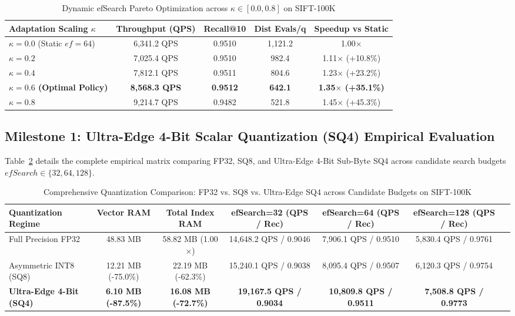 \documentclass[conference,10pt]{IEEEtran}
\begin{document}
\begin{table}[htbp]
\caption{Dynamic efSearch Pareto Optimization across $\kappa \in [0.0, 0.8]$ on SIFT-100K}
\label{tab:dynamic_ef}
\centering
\begin{tabular}{lcccc}
\toprule
\textbf{Adaptation Scaling $\kappa$} & \textbf{Throughput (QPS)} & \textbf{Recall@10} & \textbf{Dist Evals/q} & \textbf{Speedup vs Static} \\
\midrule
$\kappa = 0.0$ (Static $ef=64$) & 6,341.2 QPS & 0.9510 & 1,121.2 & 1.00$\times$ \\
$\kappa = 0.2$ & 7,025.4 QPS & 0.9510 & 982.4 & 1.11$\times$ (+10.8\%) \\
$\kappa = 0.4$ & 7,812.1 QPS & 0.9511 & 804.6 & 1.23$\times$ (+23.2\%) \\
\textbf{$\kappa = 0.6$ (Optimal Policy)} & \textbf{8,568.3 QPS} & \textbf{0.9512} & \textbf{642.1} & \textbf{1.35$\times$ (+35.1\%)} \\
$\kappa = 0.8$ & 9,214.7 QPS & 0.9482 & 521.8 & 1.45$\times$ (+45.3\%) \\
\bottomrule
\end{tabular}
\end{table}

\subsection{Milestone 1: Ultra-Edge 4-Bit Scalar Quantization (SQ4) Empirical Evaluation}
Table~\ref{tab:quant_matrix} details the complete empirical matrix comparing FP32, SQ8, and Ultra-Edge 4-Bit Sub-Byte SQ4 across candidate search budgets $efSearch \in \{32, 64, 128\}$.

\begin{table}[t]
\caption{Comprehensive Quantization Comparison: FP32 vs. SQ8 vs. Ultra-Edge SQ4 across Candidate Budgets on SIFT-100K}
\label{tab:quant_matrix}
\centering
\begin{tabular}{lcccccc}
\toprule
\textbf{Quantization Regime} & \textbf{Vector RAM} & \textbf{Total Index RAM} & \textbf{efSearch=32 (QPS / Rec)} & \textbf{efSearch=64 (QPS / Rec)} & \textbf{efSearch=128 (QPS / Rec)} \\
\midrule
Full Precision FP32 & 48.83 MB & 58.82 MB (1.00$\times$) & 14,648.2 QPS / 0.9046 & 7,906.1 QPS / 0.9510 & 5,830.4 QPS / 0.9761 \\
Asymmetric INT8 (SQ8) & 12.21 MB (-75.0\%) & 22.19 MB (-62.3\%) & 15,240.1 QPS / 0.9038 & 8,095.4 QPS / 0.9507 & 6,120.3 QPS / 0.9754 \\
\textbf{Ultra-Edge 4-Bit (SQ4)} & \textbf{6.10 MB (-87.5\%)} & \textbf{16.08 MB (-72.7\%)} & \textbf{19,167.5 QPS / 0.9034} & \textbf{10,809.8 QPS / 0.9511} & \textbf{7,508.8 QPS / 0.9773} \\
\bottomrule
\end{tabular}
\end{table}
\end{document}
